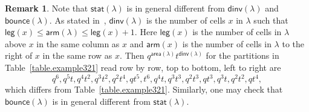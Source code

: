 \documentclass[11pt,reqno]{amsart}
\newcommand{\area}{\mathsf{area}}
\newcommand{\stat}{\mathsf{stat}}
\theoremstyle{definition}
\newtheorem{remark}[theorem]{Remark}
\numberwithin{equation}{section}
\begin{document}
\begin{remark}
Note that $\stat(\lambda)$ is in general different from $\mathsf{dinv}(\lambda)$ and $\mathsf{bounce}(\lambda)$.
As stated in~\cite[Exercise 3.19]{Haglund.2008}, $\mathsf{dinv}(\lambda)$ is the number of cells $x$ in $\lambda$
such that $\mathsf{leg}(x) \leqslant \mathsf{arm}(\lambda) \leqslant \mathsf{leg}(x) +1$. Here $\mathsf{leg}(x)$
is the number of cells in $\lambda$ above $x$ in the same column as $x$ and $\mathsf{arm}(x)$ is the number of
cells in $\lambda$ to the right of $x$ in the same row as $x$. Then $q^{\area(\lambda)} t^{\mathsf{dinv}(\lambda)}$
for the partitions in Table~\ref{table.example321} read row by row, top to bottom, left to right are
\[
	q^6, q^5 t, q^4 t^2, q^3 t^2, q^2 t^4, q t^5, t^6, q^4t, q^3 t^3, q^2 t^3, q t^3, q^3 t, q^2 t^2, q t^4,
\]
which differs from Table~\ref{table.example321}. Similarly, one may check that $\mathsf{bounce}(\lambda)$
is in general different from $\stat(\lambda)$.
\end{remark}
\end{document}

